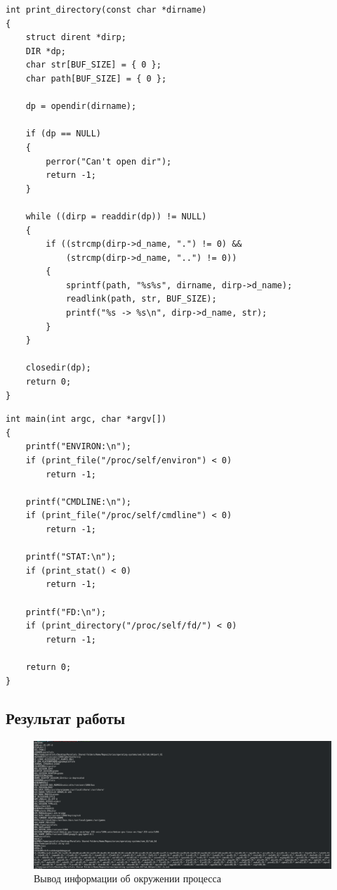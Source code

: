 \begin{lstlisting}[caption=Вывод содержимого директории]
int print_directory(const char *dirname)
{
    struct dirent *dirp;
    DIR *dp;
    char str[BUF_SIZE] = { 0 };
    char path[BUF_SIZE] = { 0 };

    dp = opendir(dirname);

    if (dp == NULL)
    {
        perror("Can't open dir");
        return -1;
    }

    while ((dirp = readdir(dp)) != NULL)
    {
        if ((strcmp(dirp->d_name, ".") != 0) &&
            (strcmp(dirp->d_name, "..") != 0))
        {
            sprintf(path, "%s%s", dirname, dirp->d_name);
            readlink(path, str, BUF_SIZE);
            printf("%s -> %s\n", dirp->d_name, str);
        }
    }

    closedir(dp);
    return 0;
}
\end{lstlisting}

\begin{lstlisting}[caption=Функция {\ttfamily main}]
int main(int argc, char *argv[])
{
    printf("ENVIRON:\n");
    if (print_file("/proc/self/environ") < 0)
        return -1;

    printf("CMDLINE:\n");
    if (print_file("/proc/self/cmdline") < 0)
        return -1;

    printf("STAT:\n");
    if (print_stat() < 0)
        return -1;

    printf("FD:\n");
    if (print_directory("/proc/self/fd/") < 0)
        return -1;

    return 0;
}
\end{lstlisting}

\subsection{Результат работы}

\begin{figure}[H]
    \centering
    \includegraphics[scale=0.40]{img/part_01/env.png}
    \caption{Вывод информации об окружении процесса}
\end{figure}

